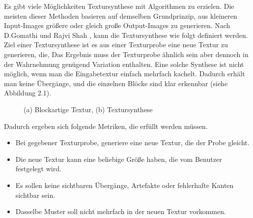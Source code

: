 \documentclass[12pt, a4paper,twoside,openany]{report} %
\begin{document}
Es gibt viele Möglichkeiten Textursynthese mit Algorithmen zu erzielen.
Die meisten dieser Methoden basieren auf demselben Grundprinzip, aus kleineren Input-Images größere oder gleich große Output-Images zu generieren.
Nach D.Gomathi und Rajvi Shah \cite[S.1]{GomathiShah2009}, kann die Textursynthese wie folgt definiert werden.
\newline
Ziel einer Textursynthese ist es aus einer Texturprobe eine neue Textur zu generieren, die, 
Das Ergebnis muss der Texturprobe ähnlich sein aber dennoch in der Wahrnehmung genügend Variation enthalten.
Eine solche Synthese ist nicht möglich, wenn man die Eingabetextur einfach mehrfach kachelt.
Dadurch erhält man keine  Übergänge, und die einzelnen Blöcke sind klar erkennbar {(siehe Abbildung 2.1)}.

\begin{figure}[H]
    \centering
    \qquad
    \caption{(a) Blockartige Textur, (b) Textursynthese}%
\end{figure}

\noindent Dadurch ergeben sich folgende Metriken, die erfüllt werden müssen.

\begin{itemize}
    \item Bei gegebener Texturprobe, generiere eine neue Textur, die der Probe gleicht.
    \item Die neue Textur kann eine beliebige Größe haben, die vom Benutzer festgelegt wird.
    \item Es sollen keine sichtbaren Übergänge, Artefakte oder fehlerhafte Kanten sichtbar sein.
    \item Dasselbe Muster soll nicht mehrfach in der neuen Textur vorkommen. \cite[S.2]{GomathiShah2009}
\end{itemize}
\end{document}
